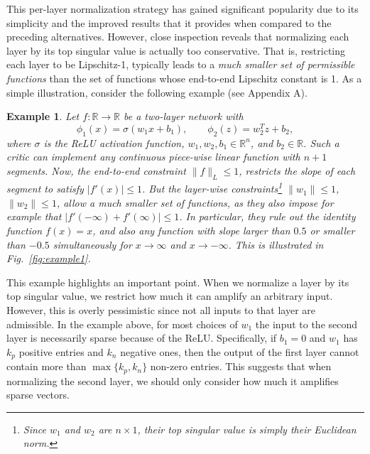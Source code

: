 \documentclass[letterpaper]{article} %
\newtheorem{example}{Example}
\begin{document}
This per-layer normalization strategy has gained significant popularity due to its simplicity and the improved results that it provides when compared to the preceding alternatives. However, close inspection reveals that normalizing each layer by its top singular value is actually too conservative. That is, restricting each layer to be Lipschitz-1, typically leads to a \emph{much smaller set of permissible functions} than the set of functions whose end-to-end Lipschitz constant is 1. As a simple illustration, consider the following example (see Appendix A).
\begin{example}
	Let $f:\mathbb{R}\rightarrow\mathbb{R}$ be a two-layer network with
	\begin{equation}
	\phi_1(x)= \sigma(w_1 x + b_1),\qquad \phi_2(z)= w_2^T z + b_2,  
	\end{equation}
 where $\sigma$ is the ReLU activation function, $w_1,w_2,b_1\in\mathbb{R}^n$, and $b_2\in\mathbb{R}$. 
	Such a critic can implement any continuous piece-wise linear function with $n+1$ segments. Now, the end-to-end constraint $\|f\|_L\leq 1$, restricts the slope of each segment to satisfy $|f'(x)|\leq 1$. But the layer-wise constraints\footnote{Since $w_1$ and $w_2$ are $n\times 1$, their top singular value is simply their Euclidean norm.} $\|w_1\|\leq 1$, $\|w_2\|\leq 1$, allow a much smaller set of functions, as they also impose for example that $|f'(-\infty)+f'(\infty)|\leq 1$. In particular, they rule out the identity function $f(x)=x$, and also any function with slope larger than $0.5$ or smaller than $-0.5$ simultaneously for $x\rightarrow\infty$ and $x\rightarrow-\infty$. This is illustrated in Fig.~\ref{fig:example1}.
\end{example}


This example highlights an important point. When we normalize a layer by its top singular value, we restrict how much it can amplify an arbitrary input. However, this is overly pessimistic since not all inputs to that layer are admissible. In the example above, for most choices of $w_1$ the input to the second layer is necessarily sparse because of the ReLU. Specifically, if $b_1=0$ and $w_1$ has $k_p$ positive entries and $k_n$ negative ones, then the output of the first layer cannot contain more than $\max\{k_p,k_n\}$ non-zero entries. This suggests that when normalizing the second layer, we should only consider how much it amplifies sparse vectors.
\end{document}
